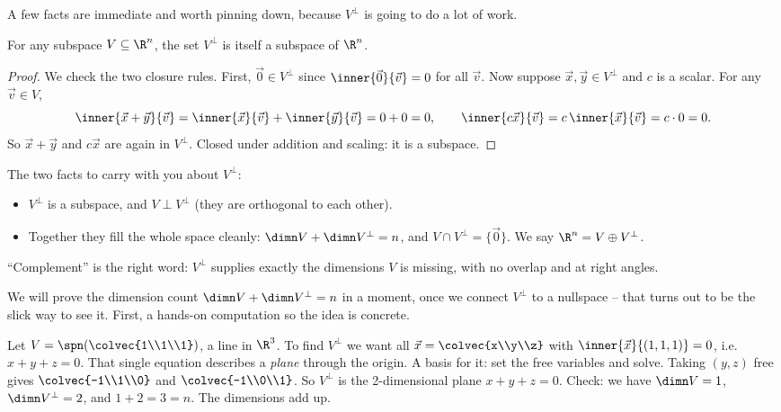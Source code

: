 A few facts are immediate and worth pinning down, because $V^\perp$ is going to do a lot of work.

\begin{proposition}\label{ch17:perp-is-subspace}
For any subspace $V\subseteq\R^n$, the set $V^{\perp}$ is itself a subspace of $\R^n$.
\end{proposition}

\begin{proof}
We check the two closure rules. First, $\vec{0}\in V^\perp$ since $\inner{\vec{0}}{\vec{v}}=0$ for
all $\vec{v}$. Now suppose $\vec{x},\vec{y}\in V^\perp$ and $c$ is a scalar. For any $\vec{v}\in V$,
\[
  \inner{\vec{x}+\vec{y}}{\vec{v}} = \inner{\vec{x}}{\vec{v}} + \inner{\vec{y}}{\vec{v}} = 0+0 = 0,
  \qquad
  \inner{c\vec{x}}{\vec{v}} = c\,\inner{\vec{x}}{\vec{v}} = c\cdot 0 = 0.
\]
So $\vec{x}+\vec{y}$ and $c\vec{x}$ are again in $V^\perp$. Closed under addition and scaling: it
is a subspace.
\end{proof}

\begin{focusbox}
The two facts to carry with you about $V^\perp$:
\begin{itemize}
  \item $V^\perp$ is a subspace, and $V\perp V^\perp$ (they are orthogonal to each other).
  \item Together they fill the whole space cleanly: $\dimn V + \dimn V^\perp = n$, and
        $V\cap V^\perp=\{\vec0\}$. We say $\R^n = V \oplus V^\perp$.
\end{itemize}
``Complement'' is the right word: $V^\perp$ supplies exactly the dimensions $V$ is missing, with no
overlap and at right angles.
\end{focusbox}

We will prove the dimension count $\dimn V + \dimn V^\perp = n$ in a moment, once we connect $V^\perp$
to a nullspace -- that turns out to be the slick way to see it. First, a hands-on computation so the
idea is concrete.

\begin{labbox}
Let $V=\spn\!\left(\colvec{1\\1\\1}\right)$, a line in $\R^3$. To find $V^\perp$ we want all
$\vec{x}=\colvec{x\\y\\z}$ with $\inner{\vec{x}}{(1,1,1)}=0$, i.e.\ $x+y+z=0$. That single equation
describes a \emph{plane} through the origin. A basis for it: set the free variables and solve.
Taking $(y,z)$ free gives $\colvec{-1\\1\\0}$ and $\colvec{-1\\0\\1}$. So $V^\perp$ is the
2-dimensional plane $x+y+z=0$. Check: we have $\dimn V=1$, $\dimn V^\perp=2$, and
$1+2=3=n$. The dimensions add up.
\end{labbox}

